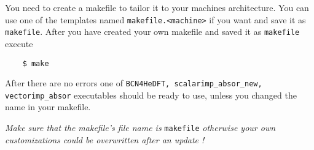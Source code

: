 \documentclass[10pt,a4paper]{article}
\begin{document}
	You need to create a makefile to tailor it to your machines architecture. You can use one of the templates named  \verb|makefile.<machine>| if you want and save it as \verb|makefile|. After you have created your own makefile and saved it as \verb|makefile| execute
	\begin{verbatim}
	$ make
	\end{verbatim}
	After there are no errors one of \verb|BCN4HeDFT, scalarimp_absor_new, vectorimp_absor| executables should be ready to use, unless you changed the name in your makefile.
	
	\emph{Make sure that the makefile's file name is} \verb+makefile+ \emph{otherwise your own customizations could be overwritten after an update !}
\end{document}
